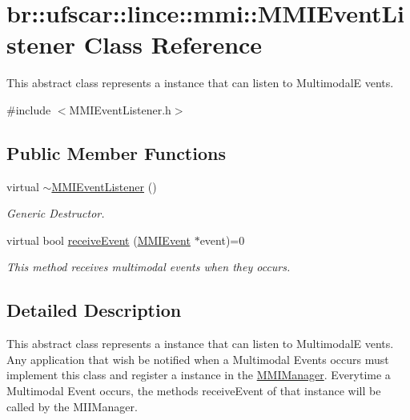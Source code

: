 \hypertarget{classbr_1_1ufscar_1_1lince_1_1mmi_1_1MMIEventListener}{
\section{br::ufscar::lince::mmi::MMIEventListener Class Reference}
\label{classbr_1_1ufscar_1_1lince_1_1mmi_1_1MMIEventListener}
}


This abstract class represents a instance that can listen to MultimodalE vents.  




{\ttfamily \#include $<$MMIEventListener.h$>$}

\subsection*{Public Member Functions}
\begin{DoxyCompactItemize}
\item 
virtual \hyperlink{classbr_1_1ufscar_1_1lince_1_1mmi_1_1MMIEventListener_a49dad88c24782f8d123289aea725e73e}{$\sim$MMIEventListener} ()
\begin{DoxyCompactList}\small\item\em Generic Destructor. \item\end{DoxyCompactList}\item 
virtual bool \hyperlink{classbr_1_1ufscar_1_1lince_1_1mmi_1_1MMIEventListener_a2b7631e7ed09e2235b021fb2b5ba3b66}{receiveEvent} (\hyperlink{classbr_1_1ufscar_1_1lince_1_1mmi_1_1MMIEvent}{MMIEvent} $\ast$event)=0
\begin{DoxyCompactList}\small\item\em This method receives multimodal events when they occurs. \item\end{DoxyCompactList}\end{DoxyCompactItemize}


\subsection{Detailed Description}
This abstract class represents a instance that can listen to MultimodalE vents. Any application that wish be notified when a Multimodal Events occurs must implement this class and register a instance in the \hyperlink{classbr_1_1ufscar_1_1lince_1_1mmi_1_1MMIManager}{MMIManager}. Everytime a Multimodal Event occurs, the methods receiveEvent of that instance will be called by the MIIManager. 

